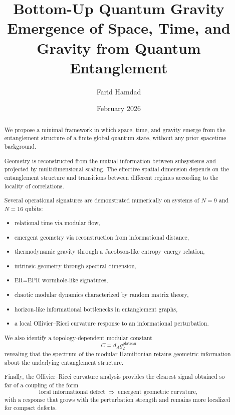 \documentclass[11pt]{article}
\title{Bottom-Up Quantum Gravity\\
Emergence of Space, Time, and Gravity from Quantum Entanglement}
\author{Farid Hamdad}
\date{February 2026}
\begin{document}
\maketitle

\begin{abstract}

We propose a minimal framework in which space, time, and gravity emerge from the entanglement structure of a finite global quantum state, without any prior spacetime background.

Geometry is reconstructed from the mutual information between subsystems and projected by multidimensional scaling. The effective spatial dimension depends on the entanglement structure and transitions between different regimes according to the locality of correlations.

Several operational signatures are demonstrated numerically on systems of $N=9$ and $N=16$ qubits:

\begin{itemize}
\item relational time via modular flow,
\item emergent geometry via reconstruction from informational distance,
\item thermodynamic gravity through a Jacobson-like entropy--energy relation,
\item intrinsic geometry through spectral dimension,
\item ER=EPR wormhole-like signatures,
\item chaotic modular dynamics characterized by random matrix theory,
\item horizon-like informational bottlenecks in entanglement graphs,
\item a local Ollivier--Ricci curvature response to an informational perturbation.
\end{itemize}

We also identify a topology-dependent modular constant
\[
C = d_A g_2^{\mathrm{plateau}}
\]
revealing that the spectrum of the modular Hamiltonian retains geometric information about the underlying entanglement structure.

Finally, the Ollivier--Ricci curvature analysis provides the clearest signal obtained so far of a coupling of the form
\[
\text{local informational defect}
\;\Longrightarrow\;
\text{emergent geometric curvature},
\]
with a response that grows with the perturbation strength and remains more localized for compact defects.

\end{abstract}
\end{document}
